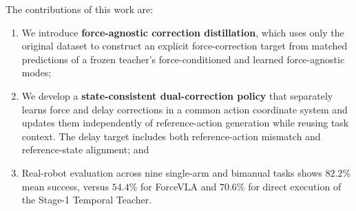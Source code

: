 The contributions of this work are:
\begin{enumerate}
    \item We introduce \textbf{force-agnostic correction distillation}, which uses only the original dataset to construct an explicit force-correction target from matched predictions of a frozen teacher's force-conditioned and learned force-agnostic modes;
    \item We develop a \textbf{state-consistent dual-correction policy} that separately learns force and delay corrections in a common action coordinate system and updates them independently of reference-action generation while reusing task context. The delay target includes both reference-action mismatch and reference-state alignment; and
    \item Real-robot evaluation across nine single-arm and bimanual tasks shows $82.2\%$ mean success, versus $54.4\%$ for ForceVLA and $70.6\%$ for direct execution of the Stage-1 Temporal Teacher.
\end{enumerate}
